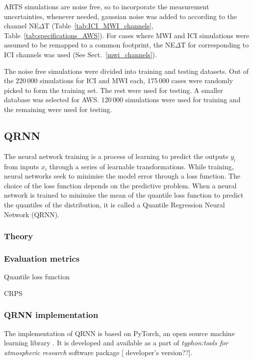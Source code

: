 \documentclass[amt, manuscript]{copernicus}
\newcommand{\todo}[1]{{\color{red} #1}}
\begin{document}
ARTS simulations are noise free, so to incorporate the measurement uncertainties, whenever needed, gaussian noise was added to according to the channel NE$\Delta$T (Table~\ref{tab:ICI_MWI_channels}, Table~\ref{tab:specifications_AWS}). For cases where MWI and ICI simulations were assumed to be remapped to a common footprint, the NE$\Delta$T for corresponding to ICI channels was used (See Sect.~\ref{mwi_channels}).

The noise free simulations were divided into training and testing datasets. Out of the 220\,000 simulations for ICI and MWI each, 175\,000 cases were randomly picked to form the training set. The rest were used for testing. A smaller database was selected for AWS. 120\,000 simulations were used for training and the 
remaining were used for testing.

\subsection{QRNN}
%
The neural network training is a process of learning to predict the outputs {$y_i$} from inputs {$x_i$} through a series of learnable transformations. While training, neural networks seek to minimise the model error through a loss function. The choice of the loss function depends on the predictive problem. When a neural network is trained to minimise the mean of the quantile loss function to predict the quantiles of the distribution, it is called a Quantile Regression Neural Network (QRNN). 

\subsubsection{Theory}

\subsubsection{Evaluation metrics}

Quantile loss function

CRPS

\subsubsection{QRNN implementation}
\label{sec:qrnn-implementation}

The implementation of QRNN is based on PyTorch, an open source machine learning library \citep{paszke2017automatic}. It is developed and available as a part of \textit{typhon:tools for atmospheric research} software package [\todo{developer's version??}].
\end{document}
